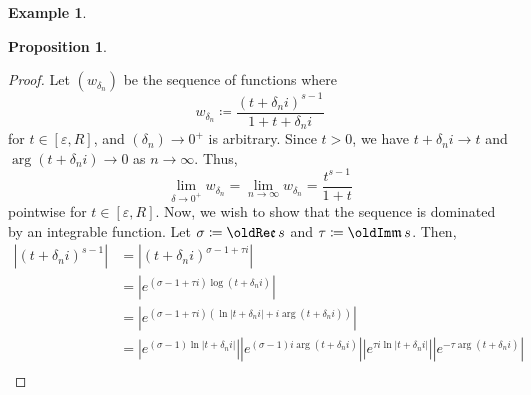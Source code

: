 \documentclass[a4paper]{article}
\renewcommand{\Im}{\mathop{\oldIm\mathfrak{m}}}
\renewcommand{\Re}{\mathop{\oldRe\mathfrak{e}}}
\newtheorem{proposition}[theorem]{Proposition}
\theoremstyle{definition}
\newtheorem{example}[theorem]{Example}
\begin{document}
\begin{example}
\begin{proposition}
\begin{equation*}
        \end{equation*}
    \end{proposition}
    \begin{proof}
        Let $(w_{\delta_n})$ be the sequence of functions where
        \begin{equation*}
            w_{\delta_n} \coloneq \frac{(t+\delta_n i)^{s-1}}{1+t+\delta_n i}
        \end{equation*}
        for $t \in [\varepsilon, R]$, and $(\delta_n) \to 0^+$ is arbitrary.
        Since $t > 0$, we have $t+\delta_n i \to t$ and $\arg(t+\delta_n i) \to 0$ as $n \to \infty$.
        Thus,
        \begin{equation*}
            \lim_{\delta \to 0^+} w_{\delta_n} = \lim_{n \to \infty} w_{\delta_n} = \frac{t^{s-1}}{1+t}
        \end{equation*}
        pointwise for $t \in [\varepsilon, R]$.
        Now, we wish to show that the sequence is dominated by an integrable function.
        Let $\sigma \coloneq \Re s$ and $\tau \coloneq \Im s$.
        Then,
        \begin{align*}
            \left\lvert (t + \delta_n i)^{s-1} \right\rvert & = \left\lvert (t + \delta_n i)^{\sigma-1+\tau i} \right\rvert                                                                                                                                                                                                      \\
                                                            & = \left\lvert e^{(\sigma-1+\tau i)\log(t + \delta_n i)} \right\rvert                                                                                                                                                                                               \\
                                                            & = \left\lvert e^{(\sigma-1+\tau i)(\ln\lvert t + \delta_n i\rvert + i \arg(t + \delta_n i))} \right\rvert                                                                                                                                                          \\
                                                            & = \left\lvert e^{(\sigma-1) \ln\lvert t + \delta_n i\rvert} \right\rvert \left\lvert e^{(\sigma-1) i \arg(t + \delta_n i)} \right\rvert \left\lvert e^{\tau i \ln\lvert t + \delta_n i\rvert} \right\rvert \left\lvert e^{- \tau \arg (t+\delta_n i)} \right\rvert \\

\end{align*}
\end{proof}
\end{example}
\end{document}
